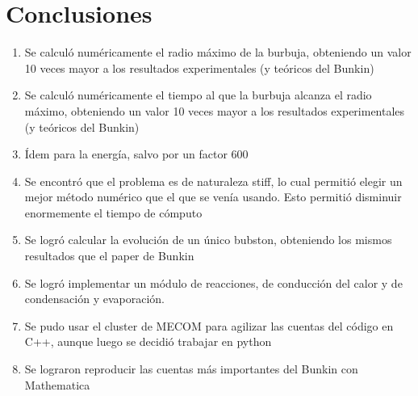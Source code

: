 \documentclass[aps,prb,onecolumn,superscriptaddress,floatfix,longbibliography,10pt]{revtex4-2}
\newcounter{para}
\begin{document}
\section*{Conclusiones}
\begin{enumerate}
  \item Se calculó numéricamente el radio máximo de la burbuja, obteniendo un valor 10 veces mayor a los resultados experimentales (y teóricos del Bunkin)
  \item Se calculó numéricamente el tiempo al que la burbuja alcanza el radio máximo, obteniendo un valor 10 veces mayor a los resultados experimentales (y teóricos del Bunkin)
  \item Ídem para la energía, salvo por un factor 600
  \item Se encontró que el problema es de naturaleza stiff, lo cual permitió elegir un mejor método numérico que el que se venía usando. Esto permitió disminuir enormemente el tiempo de cómputo
  \item Se logró calcular la evolución de un único bubston, obteniendo los mismos resultados que el paper de Bunkin
  \item Se logró implementar un módulo de reacciones, de conducción del calor y de condensación y evaporación.
  \item Se pudo usar el cluster de MECOM para agilizar las cuentas del código en C++, aunque luego se decidió trabajar en python
  \item Se lograron reproducir las  cuentas más importantes del Bunkin con Mathematica



\end{enumerate}





\end{document}
